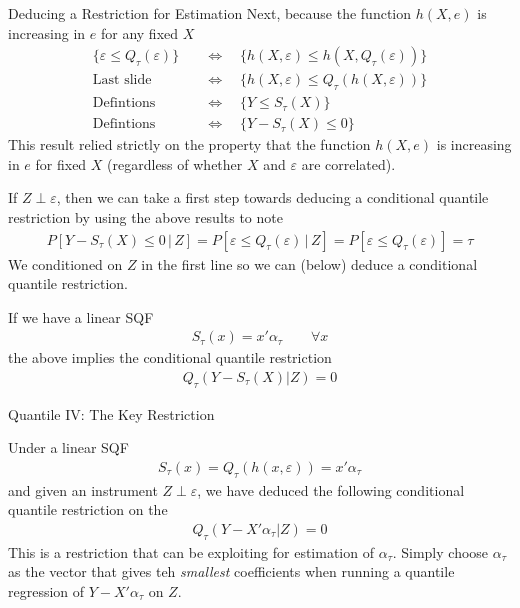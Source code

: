 \documentclass[handout]{beamer}
\begin{document}
\begin{frame}[shrink]{Deducing a Restriction for Estimation}
Next, because the function $h(X,e)$ is increasing in $e$ for any fixed
$X$
\begin{align*}
  \{\varepsilon\leq Q_\tau(\varepsilon)\}
  \quad&\iff\quad
  \{h(X,\varepsilon)\leq h(X,Q_\tau(\varepsilon))\}
  \\
  \text{Last slide}
  \quad&\iff\quad
  \{h(X,\varepsilon)\leq Q_\tau(h(X,\varepsilon))\}
  \\
  \text{Defintions}
  \quad&\iff\quad
  \{Y\leq S_\tau(X)\}
  \\
  \text{Defintions}
  \quad&\iff\quad
  \{Y-S_\tau(X)\leq 0\}
\end{align*}
This result relied strictly on the property that the function $h(X,e)$
is increasing in $e$ for fixed $X$ (regardless of whether $X$ and
$\varepsilon$ are correlated).


If $Z\perp \varepsilon$, then we can take a first step towards deducing
a conditional quantile restriction by using the above results to note
\begin{align*}
  P[Y-S_\tau(X)\leq 0\,|\,Z]
  =
  P[\varepsilon \leq Q_\tau(\varepsilon)\,|\,Z]
  =
  P[\varepsilon \leq Q_\tau(\varepsilon)]
  =
  \tau
\end{align*}
We conditioned on $Z$ in the first line so we can (below) deduce a
conditional quantile restriction.

If we have a linear SQF
\begin{align*}
  S_\tau(x) = x'\alpha_\tau
  \qquad
  \forall x
\end{align*}
the above implies the conditional quantile restriction
\begin{align*}
  Q_\tau(Y-S_\tau(X)|Z)
  =
  0
\end{align*}
\end{frame}

\begin{frame}[shrink]{Quantile IV: The Key Restriction}

Under a linear SQF
\begin{align*}
  S_\tau(x)
  = Q_\tau(h(x,\varepsilon))
  =
  x'\alpha_\tau
\end{align*}
and given an instrument $Z\perp \varepsilon$, we have deduced the
following conditional quantile restriction on the
\begin{align*}
  Q_\tau(Y-X'\alpha_\tau|Z)
  = 0
\end{align*}
This is a restriction that can be exploiting for estimation of
$\alpha_\tau$.
Simply choose $\alpha_\tau$ as the vector that gives teh \emph{smallest}
coefficients when running a quantile regression of $Y-X'\alpha_\tau$ on
$Z$.
\end{frame}
\end{document}
